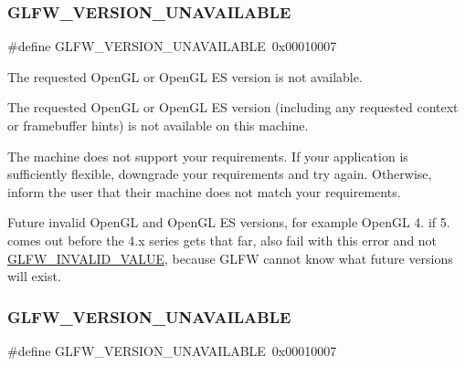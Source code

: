 \subsubsection{\texorpdfstring{G\+L\+F\+W\+\_\+\+V\+E\+R\+S\+I\+O\+N\+\_\+\+U\+N\+A\+V\+A\+I\+L\+A\+B\+LE}{GLFW\_VERSION\_UNAVAILABLE}\hspace{0.1cm}{\footnotesize\ttfamily [4/5]}}
{\footnotesize\ttfamily \#define G\+L\+F\+W\+\_\+\+V\+E\+R\+S\+I\+O\+N\+\_\+\+U\+N\+A\+V\+A\+I\+L\+A\+B\+LE~0x00010007}



The requested Open\+GL or Open\+GL ES version is not available. 

The requested Open\+GL or Open\+GL ES version (including any requested context or framebuffer hints) is not available on this machine.

The machine does not support your requirements. If your application is sufficiently flexible, downgrade your requirements and try again. Otherwise, inform the user that their machine does not match your requirements.

\begin{DoxyParagraph}{}
Future invalid Open\+GL and Open\+GL ES versions, for example Open\+GL 4. if 5. comes out before the 4.\+x series gets that far, also fail with this error and not \hyperlink{group__errors_gaaf2ef9aa8202c2b82ac2d921e554c687}{G\+L\+F\+W\+\_\+\+I\+N\+V\+A\+L\+I\+D\+\_\+\+V\+A\+L\+UE}, because G\+L\+FW cannot know what future versions will exist. 
\end{DoxyParagraph}
\mbox{\label{group__errors_gad16c5565b4a69f9c2a9ac2c0dbc89462}} 
\subsubsection{\texorpdfstring{G\+L\+F\+W\+\_\+\+V\+E\+R\+S\+I\+O\+N\+\_\+\+U\+N\+A\+V\+A\+I\+L\+A\+B\+LE}{GLFW\_VERSION\_UNAVAILABLE}\hspace{0.1cm}{\footnotesize\ttfamily [5/5]}}
{\footnotesize\ttfamily \#define G\+L\+F\+W\+\_\+\+V\+E\+R\+S\+I\+O\+N\+\_\+\+U\+N\+A\+V\+A\+I\+L\+A\+B\+LE~0x00010007}



